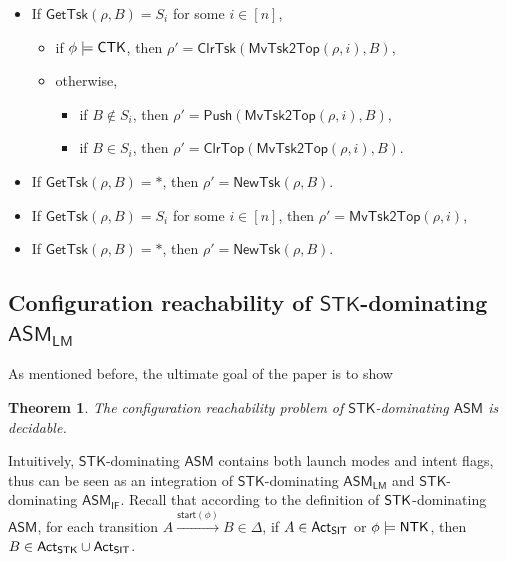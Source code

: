 \documentclass[preprint,12pt]{elsarticle}
\newtheorem{theorem}{Theorem}
\newcommand\Mm{{\mathcal{M} }}
\newcommand\act{{\sf Act}}
\newcommand\aft{{\sf Aft}}
\newcommand\lmd{{\sf Lmd}}
\newcommand\singletask{{\sf STK}}
\newcommand\singleinstance{{\sf SIT}}
\newcommand\ntkflag{{\sf NTK}}
\newcommand\ctkflag{{\sf CTK}}
\newcommand{\AMASS}{\textsf{ASM}}
\newcommand{\LMAMASS}{\textsf{ASM}_\textsf{LM}}
\newcommand{\IFAMASS}{\textsf{ASM}_\textsf{IF}}
\newcommand\startactivity{{\mathsf{start} }}
\newcommand{\STK}{\mathsf{STK}}
\newcommand{\SIT}{\mathsf{SIT}}
\newcommand\push{\mathsf{Push}}
\newcommand\clrtop{\mathsf{ClrTop}}
\newcommand\clrtsk{\mathsf{ClrTsk}}
\newcommand\mvtsktop{\mathsf{MvTsk2Top}}
\newcommand\newtsk{\mathsf{NewTsk}}
\newcommand\gettsk{\mathsf{GetTsk}}
\begin{document}
\noindent \fbox{\fbox{$\lmd(B) = \STK$}}
\begin{itemize}
	\item If $\gettsk(\rho, B) = S_i$ for some $i\in[n]$,
	\begin{itemize}
		\item if $\phi \models\ctkflag$, then $\rho' = \clrtsk(\mvtsktop(\rho, i), B)$,
		\item otherwise, 
		\begin{itemize}
			\item if $B \notin S_i$, then $\rho' = \push(\mvtsktop(\rho, i), B)$,
			\item if $B \in S_i$, then $\rho' = \clrtop(\mvtsktop(\rho, i), B)$.
		\end{itemize}
	\end{itemize}
	\item If $\gettsk(\rho, B) = *$, then $\rho' = \newtsk(\rho, B)$.
\end{itemize}
\noindent \fbox{\fbox{$\lmd(B) = \SIT$}}
\begin{itemize}
	\item If $\gettsk(\rho, B) = S_i$ for some $i \in [n]$, then $\rho' = \mvtsktop(\rho, i)$,
	\item If $\gettsk(\rho, B) = *$, then $\rho' = \newtsk(\rho, B)$.
\end{itemize}


\subsection{Configuration reachability of $\STK$-dominating $\LMAMASS$}

As mentioned before, the ultimate goal of the paper is to show 

\begin{theorem}\label{thm:st-amass-reach}
	The configuration reachability problem of $\STK$-dominating $\AMASS$ is decidable.
\end{theorem}

Intuitively, $\STK$-dominating $\AMASS$ contains both launch modes and intent flags, thus can be seen as an integration of $\STK$-dominating $\LMAMASS$ and $\STK$-dominating $\IFAMASS$. 
%
Recall that according to the definition of $\singletask$-dominating $\AMASS$, for each transition $A \xrightarrow{\startactivity(\phi)} B \in \Delta$, if $A \in \act_\singleinstance$ or $\phi \models \ntkflag$, then $B \in \act_\singletask \cup \act_\singleinstance$.
\end{document}
